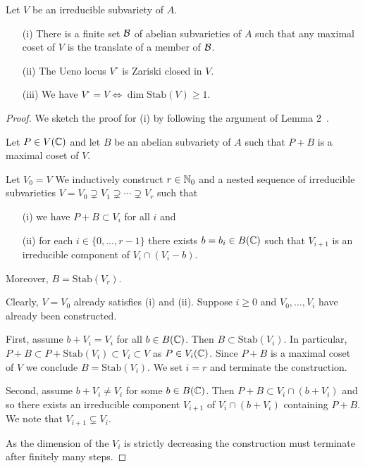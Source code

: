 \begin{theorem}
  \label{thm:ueno}
  Let $V$ be an irreducible subvariety of $A$.
  \begin{enumerate}
  \item [(i)] There is a finite set ${\mathcal B}$ of abelian subvarieties of
    $A$ such that any maximal coset of $V$ is the translate of a
    member of  ${\mathcal B}$.
  \item[(ii)] The Ueno locus $V^{\circ}$ is Zariski closed in $V$.
  \item[(iii)] We have $V^{\circ} = V\Longleftrightarrow \dim\mathrm{Stab}(V)\ge
    1$. 
  \end{enumerate}
\end{theorem}
\begin{proof}
  We sketch the proof for (i) by following the argument  of Lemma
  2~\cite{BombieriZannier:algptsav}. 

  Let $P\in V({\mathbb{C}})$ and let $B$ be an abelian subvariety of $A$ such
  that $P+B$ is a maximal coset of $V$.

  Let $V_0=V$
  We inductively construct $r\in{\mathbb{N}}_0$ and a nested sequence of irreducible subvarieties
  $V=V_0\supsetneq  V_1\supsetneq \cdots \supsetneq V_r$ such that
  \begin{itemize}
  \item [(i)] we have $P+B \subset V_i$ for all $i$ and
  \item[(ii)] for each $i\in \{0,\ldots,r-1\}$ there exists $b=b_i\in B({\mathbb{C}})$
    such that $V_{i+1}$ is an irreducible component of $V_{i}\cap (V_{i}-b)$.
  \end{itemize}
  Moreover, $B = \mathrm{Stab}(V_r)$. 

  Clearly, $V=V_0$ already satisfies (i) and (ii). Suppose $i\ge 0$
  and 
  $V_0,\ldots,V_{i}$ have already been constructed.

  First, assume  $b+V_{i} = V_{i}$ for all $b\in B({\mathbb{C}})$. Then $B\subset
  \mathrm{Stab}(V_{i})$. In particular,
  $P+B\subset P+\mathrm{Stab}(V_{i}) \subset V_{i}\subset V$ as $P\in
  V_{i}({\mathbb{C}})$. Since $P+B$ is a maximal coset of $V$ we conclude
  $B=\mathrm{Stab}(V_i)$. We set $i=r$ and terminate the construction.
  
  Second, assume $b+V_i\not=V_i$ for some $b\in B({\mathbb{C}})$.
  Then $P+B \subset V_i\cap (b+V_i)$ and so there exists an
  irreducible component $V_{i+1}$ of $V_i\cap (b+V_i)$ containing
  $P+B$. We note that $V_{i+1}\subsetneq V_i$.

  As the dimension of the $V_i$ is strictly decreasing the
  construction must terminate after finitely many steps.


\end{proof}
